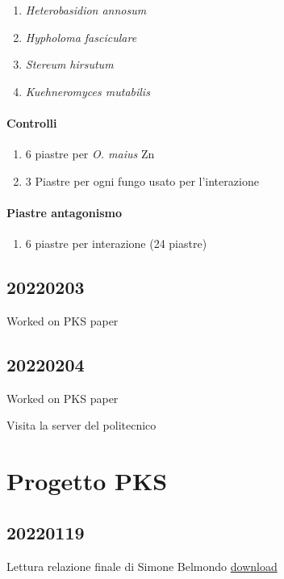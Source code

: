\documentclass[
]{book}
\providecommand{\tightlist}{%
  \setlength{\itemsep}{0pt}\setlength{\parskip}{0pt}}
\begin{document}
\begin{enumerate}
\def\labelenumi{\arabic{enumi}.}
\tightlist
\item
  \emph{Heterobasidion annosum}\\
\item
  \emph{Hypholoma fasciculare}\\
\item
  \emph{Stereum hirsutum}\\
\item
  \emph{Kuehneromyces mutabilis}
\end{enumerate}

\hypertarget{controlli}{%
\subsubsection{Controlli}\label{controlli}}

\begin{enumerate}
\def\labelenumi{\arabic{enumi}.}
\item
  6 piastre per \emph{O. maius} Zn
\item
  3 Piastre per ogni fungo usato per l'interazione
\end{enumerate}

\hypertarget{piastre-antagonismo}{%
\subsubsection{Piastre antagonismo}\label{piastre-antagonismo}}

\begin{enumerate}
\def\labelenumi{\arabic{enumi}.}
\tightlist
\item
  6 piastre per interazione (24 piastre)
\end{enumerate}

\hypertarget{D20220203}{%
\section{20220203}\label{D20220203}}

Worked on PKS paper

\hypertarget{D20220204}{%
\section{20220204}\label{D20220204}}

Worked on PKS paper

Visita la server del politecnico

\hypertarget{progetto-pks}{%
\chapter{Progetto PKS}\label{progetto-pks}}

\hypertarget{section}{%
\section{20220119}\label{section}}

Lettura relazione finale di Simone Belmondo \href{Documents/Relazione_finale_Simone_Belmondo.pdf}{download}

  
\end{document}
